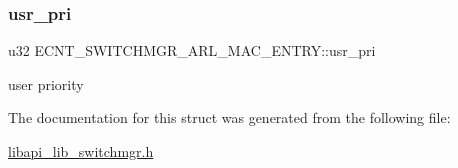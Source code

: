 \subsubsection{\texorpdfstring{usr\+\_\+pri}{usr\_pri}}
{\footnotesize\ttfamily u32 E\+C\+N\+T\+\_\+\+S\+W\+I\+T\+C\+H\+M\+G\+R\+\_\+\+A\+R\+L\+\_\+\+M\+A\+C\+\_\+\+E\+N\+T\+R\+Y\+::usr\+\_\+pri}

user priority 

The documentation for this struct was generated from the following file\+:\begin{DoxyCompactItemize}
\item 
\hyperlink{libapi__lib__switchmgr_8h}{libapi\+\_\+lib\+\_\+switchmgr.\+h}\end{DoxyCompactItemize}
